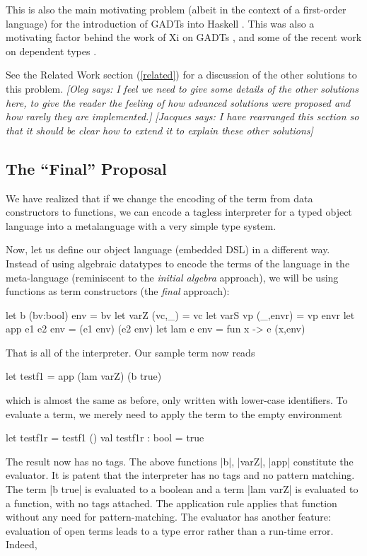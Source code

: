\documentclass[preprint]{sigplanconf}
\newcommand{\jacques}[1]{{\it [Jacques says: #1]}}
\newcommand{\oleg}[1]{{\it [Oleg says: #1]}}
\let\cite=\citep
\begin{document}
This is also the main motivating problem (albeit in the context of
a first-order language) for the introduction of GADTs 
into Haskell \cite{PeytonJonesICFP2006}.  This was also a motivating
factor behind the work of Xi on GADTs \cite{XiGADTs}, and some of the
recent work on dependent types \cite{WalidICFP02,WalidConcoqtion}.

See the Related Work section (\ref{related}) for a discussion of the other
solutions to this problem.
\oleg{I feel we need to give some details of the other solutions here, 
to give the reader the feeling of
how advanced solutions were proposed and how rarely they are
implemented.}
\jacques{I have rearranged this section so that it should be clear how
to extend it to explain these other solutions}

\subsection{The ``Final'' Proposal}\label{ourapproach}

We have realized that if we change the encoding of the term from data
constructors to functions, we can encode a tagless interpreter for a
typed object language into a metalanguage with a very simple type system.

Now, let us define our object language (embedded DSL) in a different
way. Instead of using algebraic datatypes to encode the terms of the
language in the meta-language (reminiscent to the \emph{initial algebra} 
approach), we will be using functions as term constructors (the \emph{final}
approach):

\begin{code}
  let b (bv:bool) env  = bv
  let varZ (vc,_)      = vc
  let varS vp (_,envr) = vp envr
  let app e1 e2 env    = (e1 env) (e2 env)
  let lam e env        = fun x -> e (x,env)
\end{code}

\noindent That is all of the interpreter. Our sample term now reads
\begin{code}
  let testf1 = app (lam varZ) (b true)
\end{code}
which is almost the same as before, only written with lower-case
identifiers. To evaluate a term, we merely need to apply 
the term to the empty environment

\begin{code}
  let testf1r = testf1 ()
  val testf1r : bool = true
\end{code}

The result now has no tags. The above functions |b|,
|varZ|, |app| constitute the evaluator. It is patent that the
interpreter has no tags and no pattern matching. The term |b true| is
evaluated to a boolean and a term |lam varZ| is evaluated to a
function, with no tags attached. The application rule applies that
function without any need for pattern-matching. The evaluator has
another feature: evaluation of open terms leads to a type error rather
than a run-time error. Indeed, 
\end{document}
